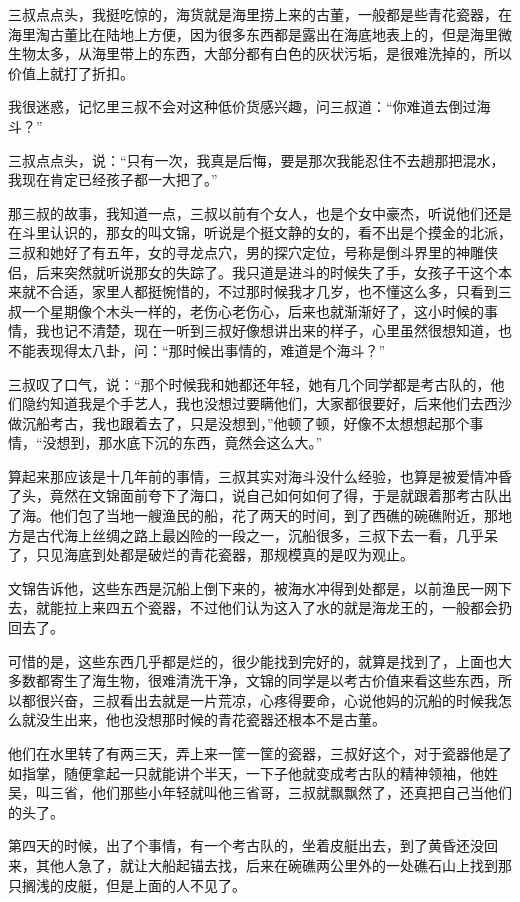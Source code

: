 三叔点点头，我挺吃惊的，海货就是海里捞上来的古董，一般都是些青花瓷器，在海里淘古董比在陆地上方便，因为很多东西都是露出在海底地表上的，但是海里微生物太多，从海里带上的东西，大部分都有白色的灰状污垢，是很难洗掉的，所以价值上就打了折扣。

我很迷惑，记忆里三叔不会对这种低价货感兴趣，问三叔道：“你难道去倒过海斗？”

三叔点点头，说：“只有一次，我真是后悔，要是那次我能忍住不去趟那把混水，我现在肯定已经孩子都一大把了。”

那三叔的故事，我知道一点，三叔以前有个女人，也是个女中豪杰，听说他们还是在斗里认识的，那女的叫文锦，听说是个挺文静的女的，看不出是个摸金的北派，三叔和她好了有五年，女的寻龙点穴，男的探穴定位，号称是倒斗界里的神雕侠侣，后来突然就听说那女的失踪了。我只道是进斗的时候失了手，女孩子干这个本来就不合适，家里人都挺惋惜的，不过那时候我才几岁，也不懂这么多，只看到三叔一个星期像个木头一样的，老伤心老伤心，后来也就渐渐好了，这小时候的事情，我也记不清楚，现在一听到三叔好像想讲出来的样子，心里虽然很想知道，也不能表现得太八卦，问：“那时候出事情的，难道是个海斗？”

三叔叹了口气，说：“那个时候我和她都还年轻，她有几个同学都是考古队的，他们隐约知道我是个手艺人，我也没想过要瞒他们，大家都很要好，后来他们去西沙做沉船考古，我也跟着去了，只是没想到，”他顿了顿，好像不太想想起那个事情，“没想到，那水底下沉的东西，竟然会这么大。”

算起来那应该是十几年前的事情，三叔其实对海斗没什么经验，也算是被爱情冲昏了头，竟然在文锦面前夸下了海口，说自己如何如何了得，于是就跟着那考古队出了海。他们包了当地一艘渔民的船，花了两天的时间，到了西礁的碗礁附近，那地方是古代海上丝绸之路上最凶险的一段之一，沉船很多，三叔下去一看，几乎呆了，只见海底到处都是破烂的青花瓷器，那规模真的是叹为观止。

文锦告诉他，这些东西是沉船上倒下来的，被海水冲得到处都是，以前渔民一网下去，就能拉上来四五个瓷器，不过他们认为这入了水的就是海龙王的，一般都会扔回去了。

可惜的是，这些东西几乎都是烂的，很少能找到完好的，就算是找到了，上面也大多数都寄生了海生物，很难清洗干净，文锦的同学是以考古价值来看这些东西，所以都很兴奋，三叔看出去就是一片荒凉，心疼得要命，心说他妈的沉船的时候我怎么就没生出来，他也没想那时候的青花瓷器还根本不是古董。

他们在水里转了有两三天，弄上来一筐一筐的瓷器，三叔好这个，对于瓷器他是了如指掌，随便拿起一只就能讲个半天，一下子他就变成考古队的精神领袖，他姓吴，叫三省，他们那些小年轻就叫他三省哥，三叔就飘飘然了，还真把自己当他们的头了。

第四天的时候，出了个事情，有一个考古队的，坐着皮艇出去，到了黄昏还没回来，其他人急了，就让大船起锚去找，后来在碗礁两公里外的一处礁石山上找到那只搁浅的皮艇，但是上面的人不见了。


